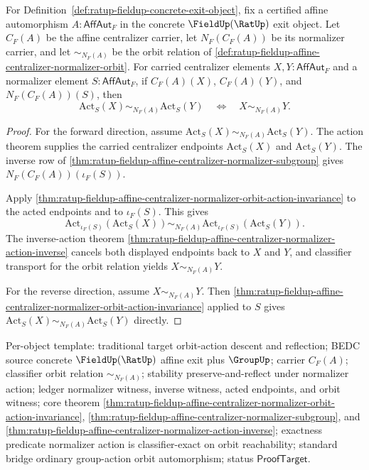 \begin{theorem}
\label{thm:ratup-fieldup-affine-centralizer-normalizer-orbit-action-equivalence}
For Definition~\ref{def:ratup-fieldup-concrete-exit-object}, fix a certified
affine automorphism $A:\mathsf{AffAut}_F$ in the concrete $\FieldUp(\RatUp)$
exit object. Let $C_F(A)$ be the affine centralizer carrier, let
$N_F(C_F(A))$ be its normalizer carrier, and let $\sim_{N_F(A)}$ be the orbit
relation of
\autoref{def:ratup-fieldup-affine-centralizer-normalizer-orbit}. For carried
centralizer elements $X,Y:\mathsf{AffAut}_F$ and a normalizer element
$S:\mathsf{AffAut}_F$, if $C_F(A)(X)$, $C_F(A)(Y)$, and $N_F(C_F(A))(S)$, then
$$
\mathrm{Act}_S(X)\sim_{N_F(A)}\mathrm{Act}_S(Y)
\quad\Longleftrightarrow\quad
X\sim_{N_F(A)}Y.
$$
\end{theorem}
\begin{proof}
For the forward direction, assume
$\mathrm{Act}_S(X)\sim_{N_F(A)}\mathrm{Act}_S(Y)$. The action theorem supplies
the carried centralizer endpoints $\mathrm{Act}_S(X)$ and $\mathrm{Act}_S(Y)$.
The inverse row of
\autoref{thm:ratup-fieldup-affine-centralizer-normalizer-subgroup} gives
$N_F(C_F(A))(\iota_F(S))$.

Apply
\autoref{thm:ratup-fieldup-affine-centralizer-normalizer-orbit-action-invariance}
to the acted endpoints and to $\iota_F(S)$. This gives
$$
\mathrm{Act}_{\iota_F(S)}(\mathrm{Act}_S(X))
\sim_{N_F(A)}
\mathrm{Act}_{\iota_F(S)}(\mathrm{Act}_S(Y)).
$$
The inverse-action theorem
\autoref{thm:ratup-fieldup-affine-centralizer-normalizer-action-inverse}
cancels both displayed endpoints back to $X$ and $Y$, and classifier transport
for the orbit relation yields $X\sim_{N_F(A)}Y$.

For the reverse direction, assume $X\sim_{N_F(A)}Y$. Then
\autoref{thm:ratup-fieldup-affine-centralizer-normalizer-orbit-action-invariance}
applied to $S$ gives
$\mathrm{Act}_S(X)\sim_{N_F(A)}\mathrm{Act}_S(Y)$ directly.
\end{proof}

Per-object template: traditional target orbit-action descent and reflection;
BEDC source concrete $\FieldUp(\RatUp)$ affine exit plus $\GroupUp$; carrier
$C_F(A)$; classifier orbit relation $\sim_{N_F(A)}$; stability preserve-and-reflect
under normalizer action; ledger normalizer witness, inverse witness, acted
endpoints, and orbit witness; core theorem
\autoref{thm:ratup-fieldup-affine-centralizer-normalizer-orbit-action-invariance},
\autoref{thm:ratup-fieldup-affine-centralizer-normalizer-subgroup}, and
\autoref{thm:ratup-fieldup-affine-centralizer-normalizer-action-inverse};
exactness predicate normalizer action is classifier-exact on orbit
reachability; standard bridge ordinary group-action orbit automorphism; status
$\mathsf{ProofTarget}$.

